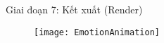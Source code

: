 \begin{frame}{Giai đoạn 7: Kết xuất (Render)}
\begin{figure}
		\centering
		\texttt{[image: EmotionAnimation]}
\end{figure}
\end{frame}




%	
%	
%	
%	

